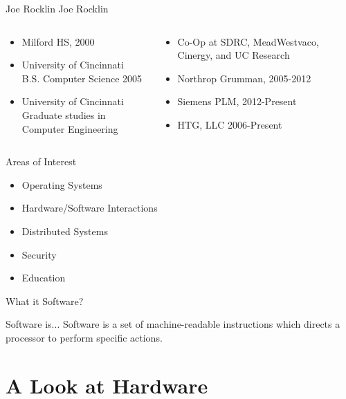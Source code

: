 \documentclass[serif,mathserif,compress]{beamer}
\begin{document}
\begin{frame}{Joe Rocklin}
  Joe Rocklin
  \begin{columns}[T]
  \begin{column}[T]{.5\textwidth}
    \begin{itemize}
    \item Milford HS, 2000
    \item University of Cincinnati\\B.S. Computer Science 2005
    \item University of Cincinnati\\Graduate studies in Computer Engineering
    \end{itemize}
  \end{column}
  \pause
  \begin{column}[T]{.5\textwidth}
    \begin{itemize}
    \item Co-Op at SDRC, MeadWestvaco, Cinergy, and UC Research
    \item Northrop Grumman, 2005-2012
    \item Siemens PLM, 2012-Present
    \item HTG, LLC 2006-Present
    \end{itemize}
  \end{column}
  \end{columns}
\end{frame}

\begin{frame}{Areas of Interest}
  \begin{itemize}
  \item Operating Systems
  \item Hardware/Software Interactions
  \item Distributed Systems
  \item Security
  \item Education
  \end{itemize}
\end{frame}

\begin{frame}{What it Software?}
  \begin{block}{Software is...}
    Software is a set of machine-readable instructions which directs a processor to perform specific actions.
  \end{block}
\end{frame}

\section{A Look at Hardware}
\end{document}
